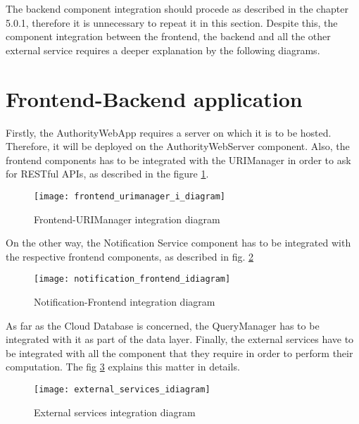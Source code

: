 The backend component integration should procede as described in the chapter 5.0.1, therefore it is unnecessary to repeat it in this section.
Despite this, the component integration between the frontend, the backend and all the other external service requires a deeper explanation by the following diagrams.
\section{Frontend-Backend application}
Firstly, the AuthorityWebApp requires a server on which it is to be hosted. Therefore, it will be deployed on the AuthorityWebServer component.
Also, the frontend components has to be integrated with the URIManager in order to ask for RESTful APIs, as described in the figure \ref{fig:frontend_urimanager_i_diagram}.
\begin{figure}[H]
    \centering
    \texttt{[image: frontend\_urimanager\_i\_diagram]}
    \caption{Frontend-URIManager integration diagram}
    \label{fig:frontend_urimanager_i_diagram}
\end{figure}
On the other way, the Notification Service component has to be integrated with the respective frontend components, as described in fig. \ref{fig:notification_frontend_idiagram}
\begin{figure}[H]
    \centering
    \texttt{[image: notification\_frontend\_idiagram]}
    \caption{Notification-Frontend integration diagram}
    \label{fig:notification_frontend_idiagram}
\end{figure}
As far as the Cloud Database is concerned, the QueryManager has to be integrated with it as part of the data layer.
Finally, the external services have to be integrated with all the component that they require in order to perform their computation. The fig \ref{fig:external_services_idiagram} explains this matter in details.
\begin{figure}[H]
    \centering
    \texttt{[image: external\_services\_idiagram]}
    \caption{External services integration diagram}
    \label{fig:external_services_idiagram}
\end{figure}